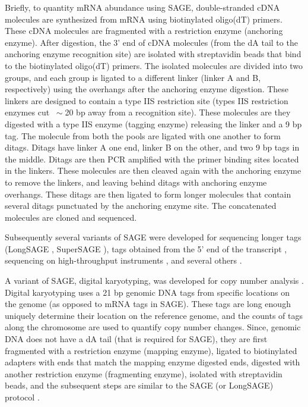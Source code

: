 Briefly, to quantity mRNA abundance using SAGE, double-stranded cDNA
molecules are synthesized from mRNA using biotinylated oligo(dT) primers.
These cDNA molecules are fragmented with a restriction enzyme (anchoring
enzyme).
%
After digestion, the 3' end of cDNA molecules (from the dA tail to the
anchoring enzyme recognition site) are isolated with streptavidin beads
that bind to the biotinylated oligo(dT) primers.
%
The isolated molecules are divided into two groups, and each group is
ligated to a different linker (linker A and B, respectively) using the
overhangs after the anchoring enzyme digestion. These linkers are
designed to contain a type IIS restriction site (types IIS restriction
enzymes cut $~\sim$20 bp away from a recognition site).
%
These molecules are they digested with a type IIS enzyme (tagging
enzyme) releasing the linker and a 9 bp tag.
%
The molecule from both the pools are ligated with one another to form
ditags. Ditags have linker A one end, linker B on the other, and two 9
bp tags in the middle.
%
Ditags are then PCR amplified with the primer binding sites located in
the linkers.
%
These molecules are then cleaved again with the anchoring enzyme to
remove the linkers, and leaving behind ditags with anchoring enzyme
overhangs.  These ditags are then ligated to form longer molecules
that contain several ditags punctuated by the anchoring enzyme site.
%
The concatenated molecules are cloned and sequenced.


Subsequently several variants of SAGE were developed for sequencing longer
tags (LongSAGE \citep{saha2002using,hu2006serial}, SuperSAGE
\citep{matsumura2003gene}), tags obtained from the 5'
end of the transcript \citep{wei20045}, sequencing on high-throughput
instruments \citep{matsumura2010high},  and several others
\citep{zawada2014massive,peters1999comprehensive}.


A variant of SAGE, digital karyotyping, was developed for copy number
analysis \citep{wang2002digital,leary2007digital}. Digital karyotyping
uses a 21 bp genomic DNA tags from specific locations on the genome (as
opposed to mRNA tags in SAGE).  These tags are long enough uniquely
determine their location on the reference genome, and the counts of
tags along the chromosome are used to quantify copy number changes.
%
Since, genomic DNA does not have a dA tail (that is required for SAGE),
they are first fragmented with a restriction enzyme (mapping enzyme),
ligated to biotinylated adapters with ends that match the mapping
enzyme digested ends, digested with another restriction enzyme
(fragmenting enzyme), isolated with streptavidin beads, and the
subsequent steps are similar to the SAGE (or LongSAGE) protocol
\citep{wang2002digital,leary2007digital}.


